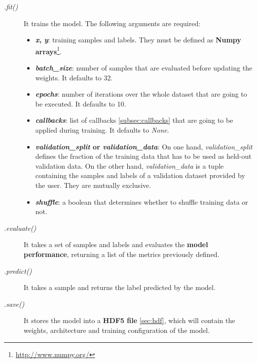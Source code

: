 \begin{description}
	\item[\textit{.fit()}] It trains the model. The following arguments are required:
	\begin{itemize}
		\item \textbf{\textit{x}, \textit{y}}: training samples and labels. They must be defined as \textbf{Numpy arrays}\footnote{\url{http://www.numpy.org/}}.
		
		\item \textbf{\textit{batch\_size}}: number of samples that are evaluated before updating the weights. It defaults to 32.
		
		\item \textbf{\textit{epochs}}: number of iterations over the whole dataset that are going to be executed. It defaults to 10.
		
		\item \textbf{\textit{callbacks}}: list of callbacks \ref{subsec:callbacks} that are going to be applied during training. It defaults to \textit{None}.
		
		\item \textbf{\textit{validation\_split} or \textit{validation\_data}}: On one hand, \textit{validation\_split} defines the fraction of the training data that has to be used as held-out validation data. On the other hand, \textit{validation\_data} is a tuple containing the samples and labels of a validation dataset provided by the user. They are mutually exclusive.
		
		\item \textbf{\textit{shuffle}}: a boolean that determines whether to shuffle training data or not. 
	\end{itemize}
\end{description}

\begin{description}
	\item[\textit{.evaluate()}] It takes a set of samples and labels and evaluates the \textbf{model performance}, returning a list of the metrics previously defined.
\end{description}

\begin{description}
	\item[\textit{.predict()}] It takes a sample and returns the label predicted by the model.
\end{description}

\begin{description}
	\item[\textit{.save()}] It stores the model into a \textbf{HDF5 file} \ref{sec:hdf}, which will contain the weights, architecture and training configuration of the model.
\end{description}

